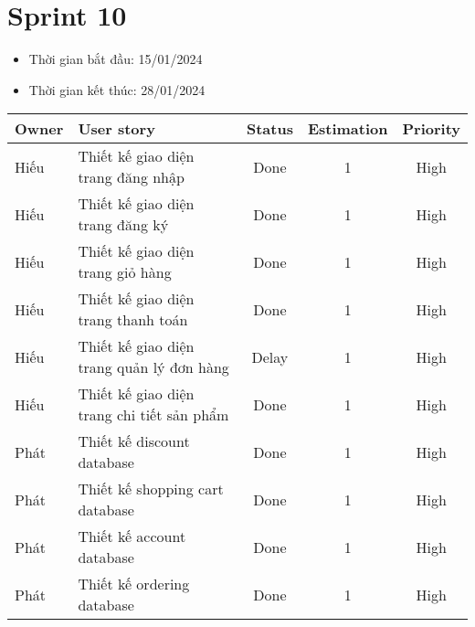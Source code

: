 \section{Sprint 10}
\begin{itemize}
    \item Thời gian bắt đầu: 15/01/2024
    \item Thời gian kết thúc: 28/01/2024
\end{itemize}
\begin{table}[H]
    \begin{tabular}{|m{2.5cm}|m{6cm}|c|c|c|}
    \hline
    \textbf{Owner}  & \textbf{User story}                                & \textbf{Status} & \textbf{Estimation} & \textbf{Priority} \\ \hline
    Hiếu               & Thiết kế giao diện trang đăng nhập                    & Done            & 1                   & High         \\ \hline
    Hiếu              & Thiết kế giao diện trang đăng ký                     & Done            & 1                   & High         \\ \hline
    Hiếu                & Thiết kế giao diện trang giỏ hàng                    & Done            & 1                   & High         \\ \hline
    Hiếu               & Thiết kế giao diện trang thanh toán                   & Done            & 1                   & High         \\ \hline
    Hiếu               & Thiết kế giao diện trang quản lý đơn hàng                    & Delay            & 1                   & High         \\ \hline
    Hiếu               & Thiết kế giao diện trang chi tiết sản phẩm                    & Done            & 1                   & High         \\ \hline
    Phát              & Thiết kế discount database                   & Done            & 1                   & High         \\ \hline
    Phát              & Thiết kế shopping cart database                    & Done            & 1                   & High         \\ \hline
    Phát              & Thiết kế account database                   & Done            & 1                   & High         \\ \hline
    Phát              & Thiết kế ordering database                    & Done            & 1                   & High         \\ \hline

\end{tabular}
\end{table}
